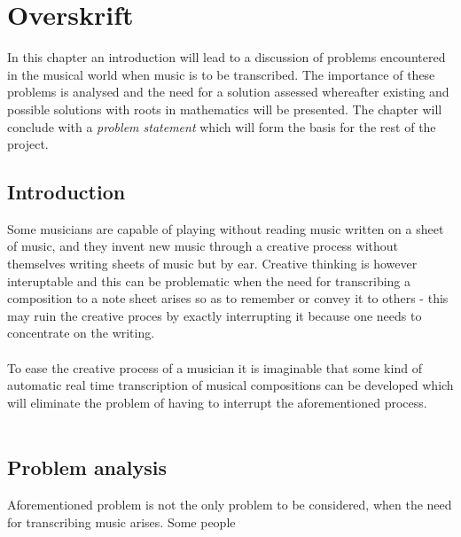 \chapter{Overskrift} \label{ch1}
In this chapter an introduction will lead to a discussion of problems encountered in the musical world when music is to be transcribed. The importance of these problems is analysed and the need for a solution assessed whereafter existing and possible solutions with roots in mathematics will be presented. The chapter will conclude with a \textit{problem statement} which will form the basis for the rest of the project.
\section{Introduction}
Some musicians are capable of playing without reading music written on a sheet of music, and they invent new music through a creative process without themselves writing sheets of music but by ear. Creative thinking is however interuptable and this can be problematic when the need for transcribing a composition to a note sheet arises so as to remember or convey it to others - this may ruin the creative proces by exactly interrupting it because one needs to concentrate on the writing.\\\\
To ease the creative process of a musician it is imaginable that some kind of automatic real time transcription of musical compositions can be developed which will eliminate the problem of having to interrupt the aforementioned process.\\\\
\section{Problem analysis}
Aforementioned problem is not the only problem to be considered, when the need for transcribing music arises. Some people 
%
